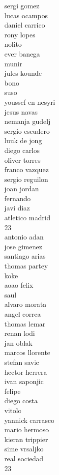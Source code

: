 \documentclass[]{article}
\begin{document}
{sergi gomez\\
lucas ocampos\\
daniel carrico\\
rony lopes\\
nolito\\
ever banega\\
munir\\
jules kounde\\
bono\\
suso\\
youssef en nesyri\\
jesus navas\\
nemanja gudelj\\
sergio escudero\\
luuk de jong\\
diego carlos\\
oliver torres\\
franco vazquez\\
sergio reguilon\\
joan jordan\\
fernando\\
javi diaz\\
atletico madrid\\
23\\
antonio adan\\
jose gimenez\\
santiago arias\\
thomas partey\\
koke\\
aoao felix\\
saul\\
alvaro morata\\
angel correa\\
thomas lemar\\
renan lodi\\
jan oblak\\
marcos llorente\\
stefan savic\\
hector herrera\\
ivan saponjic\\
felipe\\
diego costa\\
vitolo\\
yannick carrasco\\
mario hermoso\\
kieran trippier\\
sime vrsaljko\\
real sociedad\\
23\\
}
\end{document}
